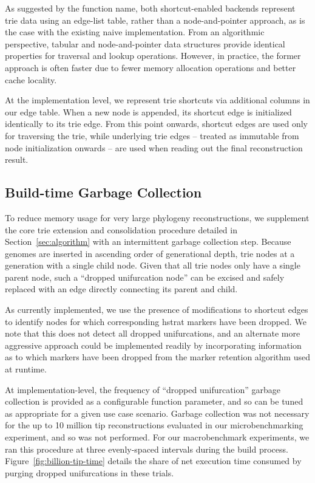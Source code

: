 As suggested by the function name, both shortcut-enabled backends represent trie data using an edge-list table, rather than a node-and-pointer approach, as is the case with the existing naive implementation.
From an algorithmic perspective, tabular and node-and-pointer data structures provide identical properties for traversal and lookup operations.
However, in practice, the former approach is often faster due to fewer memory allocation operations and better cache locality.

At the implementation level, we represent trie shortcuts via additional columns in our edge table.
When a new node is appended, its shortcut edge is initialized identically to its trie edge.
From this point onwards, shortcut edges are used only for traversing the trie, while underlying trie edges -- treated as immutable from node initialization onwards -- are used when reading out the final reconstruction result.

\subsection{Build-time Garbage Collection}

To reduce memory usage for very large phylogeny reconstructions, we supplement the core trie extension and consolidation procedure detailed in Section~\ref{sec:algorithm} with an intermittent garbage collection step.
Because genomes are inserted in ascending order of generational depth, trie nodes at a generation with a single child node.
Given that all trie nodes only have a single parent node, such a ``dropped unifurcation node'' can be excised and safely replaced with an edge directly connecting its parent and child.

As currently implemented, we use the presence of modifications to shortcut edges to identify nodes for which corresponding hstrat markers have been dropped.
We note that this does not detect all dropped unifurcations, and an alternate more aggressive approach could be implemented readily by incorporating information as to which markers have been dropped from the marker retention algorithm used at runtime.

At implementation-level, the frequency of ``dropped unifurcation'' garbage collection is provided as a configurable function parameter, and so can be tuned as appropriate for a given use case scenario.
Garbage collection was not necessary for the up to 10 million tip reconstructions evaluated in our microbenchmarking experiment, and so was not performed.
For our macrobenchmark experiments, we ran this procedure at three evenly-spaced intervals during the build process.
Figure~\ref{fig:billion-tip-time} details the share of net execution time consumed by purging dropped unifurcations in these trials.

